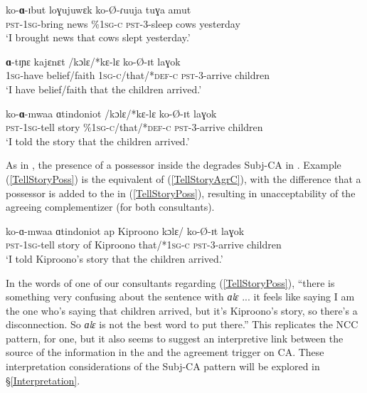 \documentclass[output=paper
,newtxmath
,modfonts
,nonflat]{langsci/langscibook}
\begin{document}
\ea 
\begin{xlist}

\ex 
\gll ko-\textbf{ɑ}-ɪbut loɣujuwɛk  ko-\O-ɾuuja tuɣa amut \\
\textsc{pst}-1\textsc{sg}-bring news \%1\textsc{sg-c} \textsc{pst}-3-sleep cows yesterday\\
\glt `I brought news that cows slept yesterday.' 

\ex
\gll \textbf{ɑ}-tɪɲɛ kajɛnɛt /kɔlɛ/*kɛ-lɛ ko-\O-ɪt laɣok \\
1\textsc{sg}-have belief/faith 1\textsc{sg-c}/that/*\textsc{def}-\textsc{c} \textsc{pst}-3-arrive children \\
\glt `I have belief/faith that the children arrived.'

\ex \label{TellStoryAgrC}
\gll ko-\textbf{ɑ}-mwaa ɑtindoniot /kɔlɛ/*kɛ-lɛ ko-\O-ɪt laɣok \\
\textsc{pst}-1\textsc{sg}-tell story \%1\textsc{sg-c}/that/*\textsc{def}-\textsc{c} \textsc{pst}-3-arrive children \\
\glt `I told the story that the children arrived.'

\end{xlist}
\z

\noindent As in , the presence of a possessor inside the  degrades Subj-CA in . Example (\ref{TellStoryPoss}) is the equivalent of (\ref{TellStoryAgrC}), with the difference that a possessor is added to the  in (\ref{TellStoryPoss}), resulting in unacceptability of the agreeing complementizer (for both consultants).

\ea \label{TellStoryPoss}

\gll ko-ɑ-mwaa ɑtindoniot ap Kiproono kɔlɛ/ ko-\O-ɪt laɣok \\
\textsc{pst}-1\textsc{sg}-tell story of Kiproono that/*1\textsc{sg-c} \textsc{pst}-3-arrive children \\
\glt `I told Kiproono's story that the children arrived.'

\z

\noindent In the words of one of our consultants regarding (\ref{TellStoryPoss}), ``there is something very confusing about the sentence with \textit{ɑlɛ} ... it feels like saying I am the one who's saying that children arrived, but it's Kiproono's story, so there's a disconnection. So \textit{ɑlɛ} is not the best word to put there.'' This replicates the  NCC pattern, for one, but it also seems to suggest an interpretive link between the source of the information in the  and the agreement trigger on CA. These interpretation considerations of the Subj-CA pattern will be explored in \S \ref{Interpretation}.
\end{document}
